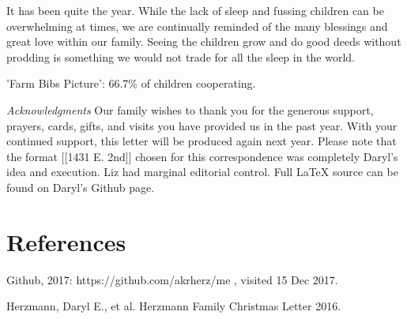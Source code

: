 \documentclass[letterpaper,11pt]{article}
\makeatletter
\def\refer{\par\noindent\hangindent\parindent\hangafter1}
\newenvironment{figurehere}
  {\def\@captype{figure}}
  {}
\makeatother
\begin{document}
\begin{multicols}{2}
It has been quite the year.  While the lack of sleep and fussing children can be
overwhelming at times, we are continually reminded of the many blessings and
great love within our family.  Seeing the children grow and do good deeds
without prodding is something we would not trade for all the sleep in the world.


\bigskip

\begin{figurehere}
 \centering   
 \caption{'Farm Bibs Picture': 66.7\% of children cooperating.}
\end{figurehere}

\bigskip
  \emph{Acknowledgments} Our family wishes to thank you for the generous 
support, prayers, cards, gifts, and visits you have provided us in the past
year. With your continued support, this letter will be produced again
next year. Please note that the format [[1431 E. 2nd]] chosen for this
correspondence was completely Daryl's idea and execution. Liz had marginal
editorial control. Full \LaTeX\xspace source can be found on Daryl's Github
page.

\section{References}

\refer Github, 2017: https://github.com/akrherz/me , visited 15 Dec 2017.
\refer Herzmann, Daryl E., et al. Herzmann Family Christmas Letter 2016. 

\end{multicols}
\end{document}
